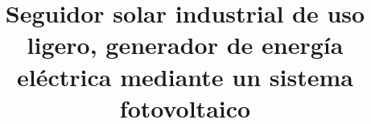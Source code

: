 \documentclass[letterpaper,10pt]{upiita}
\title{Seguidor solar industrial de uso ligero, generador de energía eléctrica mediante un sistema fotovoltaico}
\begin{document}
\renewcommand{\tablename}{Tabla}
\renewcommand{\figurename}{Figura}
\makeatletter {}\makeatother
\frontmatter
\portada                  %
\acta                     %
\cambiamargen              %
\dedicatoria              %
\agradecimientos          %
\tabladecontenido
\listadefiguras
\listadetablas
\mainmatter
\inicial
\media



%


\newpage
 \nocite{*}
 
\backmatter
\end{document}
